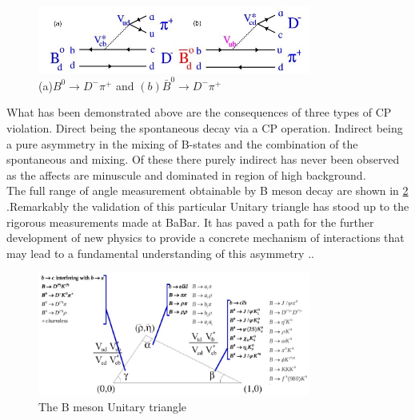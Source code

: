  \begin{figure}[h]
\centering
\includegraphics[width=0.8\textwidth]{figs/gam.JPG}
\caption{(a)$ B^{0} \rightarrow D^{-}\pi^{+}$ and $(b) \bar{B}^{0} \rightarrow D^{-}\pi^{+}$}
\label{poBGD}
\end{figure}


What has been demonstrated above are the consequences of three types of CP violation. Direct being the spontaneous decay via a CP operation. Indirect being a pure asymmetry in the mixing of B-states and the combination of the spontaneous and mixing. Of these there purely indirect has never been observed as the affects are minuscule and dominated in region of high background.
\\

The full range of angle measurement obtainable by B meson decay are shown in \cref{BBD9} .Remarkably the validation of this particular Unitary triangle has stood up to the rigorous measurements made at BaBar. It has paved a path for the further development of new physics to provide a concrete mechanism of interactions that may lead to a fundamental understanding of this asymmetry .\cite{B18}.
 \begin{figure}[h]
\centering
\includegraphics[width=0.8\textwidth]{figs/trig.JPG}
\caption{The B meson Unitary triangle}
\label{BBD9}
\end{figure}



%
